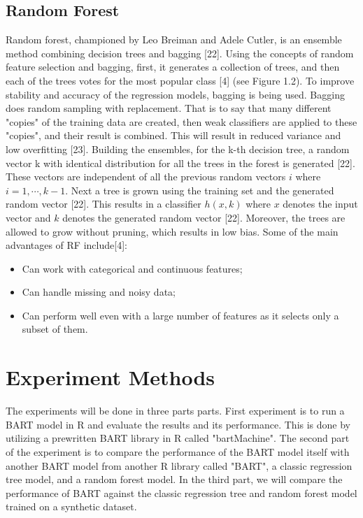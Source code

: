 \documentclass{usiinftr}
\begin{document}
\subsection{Random Forest}
Random forest, championed by Leo Breiman and Adele Cutler, is an ensemble method combining decision trees and bagging [22]. Using the concepts of random feature selection and bagging, first, it generates a collection of trees, and then each of the trees votes for the most popular class [4] (see Figure 1.2). To improve stability and accuracy of the regression models, bagging is being used. Bagging does random sampling with replacement. That is to say that  many different "copies" of the training data are created, then weak classifiers are applied to these "copies", and their result is combined. This will result in reduced variance and low overfitting [23]. 
	Building the ensembles, for the k-th decision tree, a random vector k with identical distribution for all the trees in the forest is generated [22]. These vectors are independent of all the previous random vectors $i$ where $i = 1,\cdots,k-1$. Next a tree is grown using the training set and the generated random vector [22]. This results in a classifier $h(x,k)$ where $x$ denotes the input vector and $k$ denotes the generated random vector [22]. Moreover, the trees are allowed to grow without pruning, which results in low bias.  Some of the main advantages of RF include[4]:

\begin{itemize}
\item Can work with categorical and continuous features;
\item Can handle missing and noisy data;
\item Can perform well even with a large number of features as it selects only a subset of them. 
\end{itemize} 

\section{Experiment Methods}
The experiments will be done in three parts parts. First experiment is to run a BART model in R and evaluate the results and its performance. This is done by utilizing a prewritten BART library in R called "bartMachine". The second part of the experiment is to compare the performance of the BART model itself with another BART model from another R library called "BART", a classic regression tree model, and a random forest model. In the third part, we will compare the performance of BART against the classic regression tree and random forest model trained on a synthetic dataset.
\end{document}

